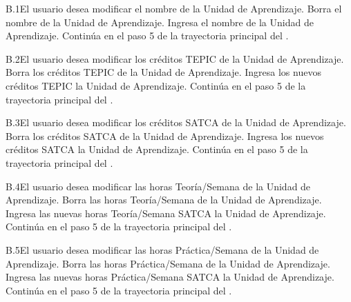 \begin{UCtrayectoriaA}{B.1}{El usuario desea modificar el nombre de la Unidad de Aprendizaje.}
	\UCpaso[\UCactor] Borra el nombre de la Unidad de Aprendizaje.
	\UCpaso[\UCactor] Ingresa el nombre de la Unidad de Aprendizaje.
	\UCpaso Continúa en el paso 5 de la trayectoria principal del .
\end{UCtrayectoriaA}


\begin{UCtrayectoriaA}{B.2}{El usuario desea modificar los créditos TEPIC de la Unidad de Aprendizaje.}
	\UCpaso[\UCactor] Borra los créditos TEPIC de la Unidad de Aprendizaje.
	\UCpaso[\UCactor] Ingresa los nuevos créditos TEPIC la Unidad de Aprendizaje.
	\UCpaso Continúa en el paso 5 de la trayectoria principal del .
\end{UCtrayectoriaA}



\begin{UCtrayectoriaA}{B.3}{El usuario desea modificar los créditos SATCA de la Unidad de Aprendizaje.}
	\UCpaso[\UCactor] Borra los créditos SATCA de la Unidad de Aprendizaje.
	\UCpaso[\UCactor] Ingresa los nuevos créditos SATCA la Unidad de Aprendizaje.
	\UCpaso Continúa en el paso 5 de la trayectoria principal del .
\end{UCtrayectoriaA}



\begin{UCtrayectoriaA}{B.4}{El usuario desea modificar las horas Teoría/Semana de la Unidad de Aprendizaje.}
	\UCpaso[\UCactor] Borra las horas Teoría/Semana de la Unidad de Aprendizaje.
	\UCpaso[\UCactor] Ingresa las nuevas horas Teoría/Semana SATCA la Unidad de Aprendizaje.
	\UCpaso Continúa en el paso 5 de la trayectoria principal del .
\end{UCtrayectoriaA}




\begin{UCtrayectoriaA}{B.5}{El usuario desea modificar las horas Práctica/Semana de la Unidad de Aprendizaje.}
	\UCpaso[\UCactor] Borra las horas Práctica/Semana de la Unidad de Aprendizaje.
	\UCpaso[\UCactor] Ingresa las nuevas horas Práctica/Semana SATCA la Unidad de Aprendizaje.
	\UCpaso Continúa en el paso 5 de la trayectoria principal del .
\end{UCtrayectoriaA}



